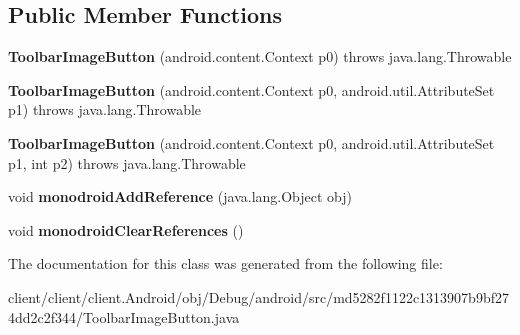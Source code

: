 \subsection*{Public Member Functions}
\begin{DoxyCompactItemize}
\item 
\hypertarget{classmd5282f1122c1313907b9bf274dd2c2f344_1_1ToolbarImageButton_a90a4c1a5024edee8487e3b2c0a5c09d7}{}{\bfseries Toolbar\+Image\+Button} (android.\+content.\+Context p0)  throws java.\+lang.\+Throwable 	\label{classmd5282f1122c1313907b9bf274dd2c2f344_1_1ToolbarImageButton_a90a4c1a5024edee8487e3b2c0a5c09d7}

\item 
\hypertarget{classmd5282f1122c1313907b9bf274dd2c2f344_1_1ToolbarImageButton_a80dc32c341faa9755913d3293b8f5608}{}{\bfseries Toolbar\+Image\+Button} (android.\+content.\+Context p0, android.\+util.\+Attribute\+Set p1)  throws java.\+lang.\+Throwable 	\label{classmd5282f1122c1313907b9bf274dd2c2f344_1_1ToolbarImageButton_a80dc32c341faa9755913d3293b8f5608}

\item 
\hypertarget{classmd5282f1122c1313907b9bf274dd2c2f344_1_1ToolbarImageButton_a22b53e206c1521ad12dfe2efa0166545}{}{\bfseries Toolbar\+Image\+Button} (android.\+content.\+Context p0, android.\+util.\+Attribute\+Set p1, int p2)  throws java.\+lang.\+Throwable 	\label{classmd5282f1122c1313907b9bf274dd2c2f344_1_1ToolbarImageButton_a22b53e206c1521ad12dfe2efa0166545}

\item 
\hypertarget{classmd5282f1122c1313907b9bf274dd2c2f344_1_1ToolbarImageButton_af8d7a1001768e63d0025ee0afee5229a}{}void {\bfseries monodroid\+Add\+Reference} (java.\+lang.\+Object obj)\label{classmd5282f1122c1313907b9bf274dd2c2f344_1_1ToolbarImageButton_af8d7a1001768e63d0025ee0afee5229a}

\item 
\hypertarget{classmd5282f1122c1313907b9bf274dd2c2f344_1_1ToolbarImageButton_a38cb4adbf4f7735b774a3054419855c2}{}void {\bfseries monodroid\+Clear\+References} ()\label{classmd5282f1122c1313907b9bf274dd2c2f344_1_1ToolbarImageButton_a38cb4adbf4f7735b774a3054419855c2}

\end{DoxyCompactItemize}


The documentation for this class was generated from the following file\+:\begin{DoxyCompactItemize}
\item 
client/client/client.\+Android/obj/\+Debug/android/src/md5282f1122c1313907b9bf274dd2c2f344/Toolbar\+Image\+Button.\+java\end{DoxyCompactItemize}
